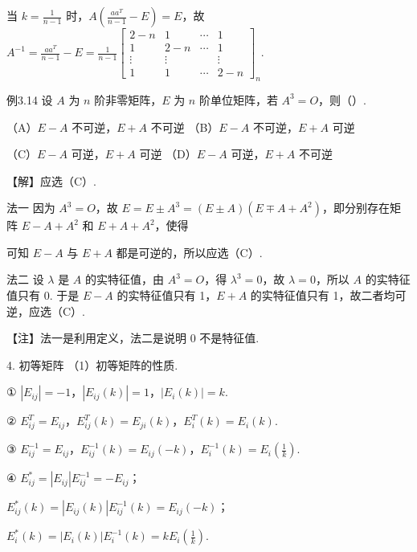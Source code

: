 

当 $k=\frac{1}{n-1}$ 时，$A\left(\frac{aa^{T}}{n-1}-E\right)=E$，故 $A^{-1}=\frac{aa^{T}}{n-1}-E=\frac{1}{n-1}\begin{bmatrix}2-n&1&\cdots&1\\1&2-n&\cdots&1\\\vdots&\vdots&&\vdots\\1&1&\cdots&2-n\end{bmatrix}_n$.

\begin{fcard}{例3.14}
设 $A$ 为 $n$ 阶非零矩阵，$E$ 为 $n$ 阶单位矩阵，若 $A^{3}=O$，则（\quad）.

（A）$E-A$ 不可逆，$E+A$ 不可逆 \qquad （B）$E-A$ 不可逆，$E+A$ 可逆

（C）$E-A$ 可逆，$E+A$ 可逆 \qquad （D）$E-A$ 可逆，$E+A$ 不可逆
\end{fcard}

【解】应选（C）.

法一 因为 $A^{3}=O$，故 $E=E\pm A^{3}=(E\pm A)(E\mp A+A^{2})$，即分别存在矩阵 $E-A+A^{2}$ 和 $E+A+A^{2}$，使得


可知 $E-A$ 与 $E+A$ 都是可逆的，所以应选（C）.

法二 设 $\lambda$ 是 $A$ 的实特征值，由 $A^{3}=O$，得 $\lambda^{3}=0$，故 $\lambda=0$，所以 $A$ 的实特征值只有 0. 于是 $E-A$ 的实特征值只有 1，$E+A$ 的实特征值只有 1，故二者均可逆，应选（C）.

\begin{fnote}
【注】法一是利用定义，法二是说明 0 不是特征值.
\end{fnote}


\begin{fcard}{4. 初等矩阵}
（1）初等矩阵的性质.

① $|E_{ij}|=-1$，$|E_{ij}(k)|=1$，$|E_i(k)|=k$.

② $E_{ij}^{T}=E_{ij}$，$E_{ij}^{T}(k)=E_{ji}(k)$，$E_i^{T}(k)=E_i(k)$.

③ $E_{ij}^{-1}=E_{ij}$，$E_{ij}^{-1}(k)=E_{ij}(-k)$，$E_i^{-1}(k)=E_i\left(\frac{1}{k}\right)$.

④ $E_{ij}^*=|E_{ij}|E_{ij}^{-1}=-E_{ij}$；

$E_{ij}^*(k)=|E_{ij}(k)|E_{ij}^{-1}(k)=E_{ij}(-k)$；

$E_i^*(k)=|E_i(k)|E_i^{-1}(k)=kE_i\left(\frac{1}{k}\right)$.
\end{fcard}

